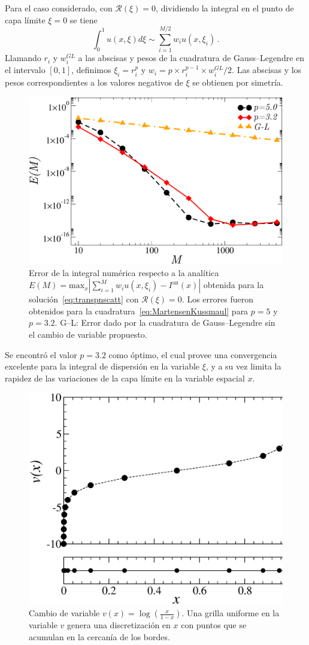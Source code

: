 Para el caso considerado, con $\mathcal{R}(\xi)=0$, 
dividiendo la integral en el punto de capa límite $\xi=0$ se tiene 
\begin{equation}
\int_{0}^{1} u(x,\xi) d\xi \sim \sum_{i=1}^{M/2} w_i u(x,\xi_i) \, .
\label{eq:MartensenKussmaul}
\end{equation}
Llamando $r_i$ y $w_i^{GL}$ a las abscisas y pesos de la 
cuadratura de Gauss--Legendre en el intervalo $[0,1]$, 
definimos $\xi_i=r_i^p$ y $w_i= p \times r_i^{p-1} \times w_i^{GL}/2$. 
Las abscisas y los pesos correspondientes a los valores negativos 
de $\xi$ se obtienen por simetría. 
\begin{figure}[h!]
\centering
  \includegraphics[width=0.5\linewidth]{figuras/quads.pdf}
  \caption{Error de la integral numérica respecto a la 
  analítica $E(M)=\text{max}_x |\sum_{i=1}^M w_i u(x,\xi_i)-I^{\text{an}}(x)|$
  obtenida para la solución~\eqref{eq:transpnscatt} con $\mathcal{R}(\xi)=0$. 
  Los errores fueron obtenidos para la cuadratura~\eqref{eq:MartensenKussmaul} 
  para $p=5$ y $p=3.2$. G--L: 
  Error dado por la cuadratura de Gauss--Legendre sin el cambio de variable propuesto.}
 \label{fig:intconvs}
\end{figure}
Se encontró el valor $p=3.2$ como óptimo, el cual 
provee una convergencia excelente para la integral 
de dispersión en la variable $\xi$, y a su vez limita la rapidez 
de las variaciones de la capa límite en la variable espacial $x$. 
\begin{figure}[h!]
\centering
  \includegraphics[width=0.5\linewidth]{figuras/puntos.eps}
  \caption{Cambio de variable $v(x) = \log \left( \frac{x}{1-x} \right)$. 
  Una grilla uniforme en la variable $v$ genera una discretización en $x$ 
  con puntos que se acumulan en la cercanía de los bordes.}
 \label{fig:pindonga}
\end{figure}
